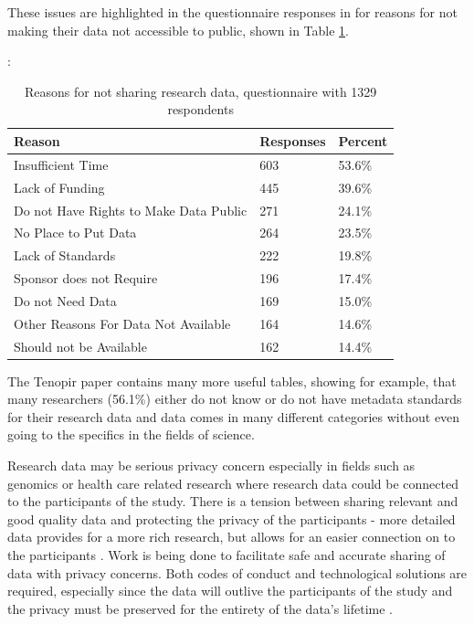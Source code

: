 These issues are highlighted in the questionnaire responses in
\cite{tenopir2011data} for reasons for not making their data not accessible
to public, shown in Table \ref{table:reasons_not_sharing}.

\begin{table}[h]
    \centering
    \caption{Reasons for not sharing research data, questionnaire with 1329
    respondents \cite{tenopir2011data}}:
    \label{table:reasons_not_sharing}
    \begin{tabular}{| l | l | l |}
      \hline
      \textbf{Reason}                           & \textbf{Responses}    & \textbf{Percent} \\
      \hline
      \rowcolor{Gray}
      Insufficient Time                         & 603                   & 53.6\% \\
      \hline
      Lack of Funding                           & 445                   & 39.6\% \\
      \hline
      \rowcolor{Gray}
      Do not Have Rights to Make Data Public    & 271                   & 24.1\% \\
      \hline
      No Place to Put Data                      & 264                   & 23.5\% \\
      \hline
      \rowcolor{Gray}
      Lack of Standards                         & 222                   & 19.8\% \\
      \hline
      Sponsor does not Require                  & 196                   & 17.4\% \\
      \hline
      \rowcolor{Gray}
      Do not Need Data                          & 169                   & 15.0\% \\
      \hline
      Other Reasons For Data Not Available      & 164                   & 14.6\% \\
      \hline
      \rowcolor{Gray}
      Should not be Available                   & 162                   & 14.4\% \\
      \hline
    \end{tabular}
\end{table}

The Tenopir paper \cite{tenopir2011data} contains many more useful tables,
showing for example, that many researchers (56.1\%) either do not know or do not have
metadata standards for their research data and data comes in many different
categories without even going to the specifics in the fields of science.

Research data may be serious privacy concern especially in fields such as
genomics or health care related research where research data could be connected
to the participants of the study. There is a tension between sharing relevant
and good quality data and protecting the privacy of the participants - more
detailed data provides for a more rich research, but allows for an easier
connection on to the participants \cite{kaye2012tension}. Work is being done
to facilitate safe and accurate sharing of data with privacy concerns. Both
codes of conduct and technological solutions are required, especially since the
data will outlive the participants of the study and the privacy must be
preserved for the entirety of the data's lifetime
\cite{DBLP:journals/jam/NohCJ14a, knoppers2011towards}.

